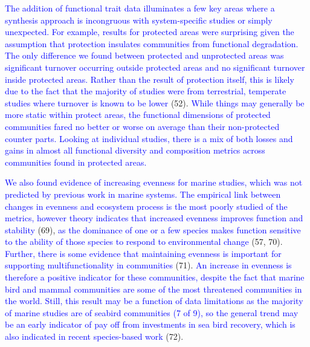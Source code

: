 \documentclass{article}
\begin{document}
\textcolor{blue}{The addition of functional trait data illuminates a few key areas where a synthesis approach is incongruous with system-specific studies or simply unexpected. For example, results for protected areas were surprising given the assumption that protection insulates communities from functional degradation. The only difference we found between protected and unprotected areas was significant turnover occurring outside protected areas and no significant turnover inside protected areas. Rather than the result of protection itself, this is likely due to the fact that the majority of studies were from terrestrial, temperate studies where turnover is known to be lower }(52).
\textcolor{blue}{While things may generally be more static within protect areas, the functional dimensions of protected communities fared no better or worse on average than their non-protected counter parts. Looking at individual studies, there is a mix of both losses and gains in almost all functional diversity and composition metrics across communities found in protected areas.}

\textcolor{blue}{We also found evidence of increasing evenness for marine studies, which was not predicted by previous work in marine systems. The empirical link between changes in evenness and ecosystem process is the most poorly studied of the metrics, however theory indicates that increased evenness improves function and stability }
(69),
\textcolor{blue}{as the dominance of one or a few species makes function sensitive to the ability of those species to respond to environmental change }(57,
70).
\textcolor{blue}{Further, there is some evidence that maintaining evenness is important for supporting multifunctionality in communities }(71).
\textcolor{blue}{An increase in evenness is therefore a positive indicator for these communities, despite the fact that marine bird and mammal communities are some of the most threatened communities in the world. Still, this result may be a function of data limitations as the majority of marine studies are of seabird communities (7 of 9), so the general trend may be an early indicator of pay off from investments in sea bird recovery, which is also indicated in recent species-based work }(72).
\end{document}
